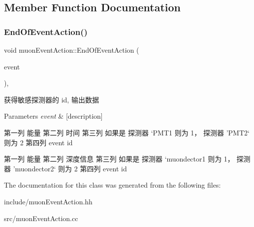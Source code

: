 \subsection{Member Function Documentation}
\mbox{\label{classmuonEventAction_a674e82851a04669f19294aae5e4a69e6}} 
\subsubsection{\texorpdfstring{End\+Of\+Event\+Action()}{EndOfEventAction()}}
{\footnotesize\ttfamily void muon\+Event\+Action\+::\+End\+Of\+Event\+Action (\begin{DoxyParamCaption}\item[{const G4\+Event $\ast$}]{event }\end{DoxyParamCaption})\hspace{0.3cm}{\ttfamily [override]}, {\ttfamily [virtual]}}



获得敏感探测器的 id, 输出数据 


\begin{DoxyParams}{Parameters}
{\em event} & \mbox{[}description\mbox{]} \\
\hline
\end{DoxyParams}
第一列 能量 第二列 时间 第三列 如果是 探测器 ‘\+P\+M\+T1\textquotesingle{} 则为 1， 探测器 ’\+P\+M\+T2‘ 则为 2 第四列 event id

第一列 能量 第二列 深度信息 第三列 如果是 探测器 ‘muondector1\textquotesingle{} 则为 1， 探测器 ’muondector2‘ 则为 2 第四列 event id

The documentation for this class was generated from the following files\+:\begin{DoxyCompactItemize}
\item 
include/muon\+Event\+Action.\+hh\item 
src/muon\+Event\+Action.\+cc\end{DoxyCompactItemize}
